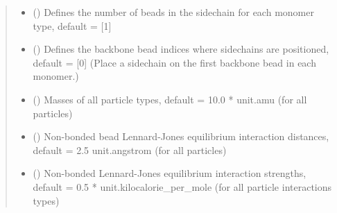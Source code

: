 \documentclass[letterpaper,12pt,english,openany,oneside]{sphinxmanual}
\begin{document}
\begin{fulllineitems}
\begin{quote}
\begin{description}
\begin{itemize}
\item {} 
 (\sphinxstyleliteralemphasis{\sphinxupquote{( }}\sphinxstyleliteralemphasis{\sphinxupquote{ )}}) \textendash{} Defines the number of beads in the sidechain for each monomer type, default = {[}1{]}

\item {} 
 (\sphinxstyleliteralemphasis{\sphinxupquote{( }}\sphinxstyleliteralemphasis{\sphinxupquote{ )}}) \textendash{} Defines the backbone bead indices where sidechains are positioned, default = {[}0{]} (Place a sidechain on the first backbone bead in each monomer.)

\item {} 
 (\sphinxstyleliteralemphasis{\sphinxupquote{( }}\sphinxstyleliteralemphasis{\sphinxupquote{, }}\sphinxstyleliteralemphasis{\sphinxupquote{ )}}) \textendash{} Masses of all particle types, default = 10.0 * unit.amu (for all particles)

\item {} 
 (\sphinxstyleliteralemphasis{\sphinxupquote{( }}\sphinxstyleliteralemphasis{\sphinxupquote{,}}\sphinxstyleliteralemphasis{\sphinxupquote{,}}) \textendash{} Non-bonded bead Lennard-Jones equilibrium interaction distances, default = 2.5 unit.angstrom (for all particles)

\item {} 
 (\sphinxstyleliteralemphasis{\sphinxupquote{( }}\sphinxstyleliteralemphasis{\sphinxupquote{,}}\sphinxstyleliteralemphasis{\sphinxupquote{,}}\sphinxstyleliteralemphasis{\sphinxupquote{ )}}) \textendash{} Non-bonded Lennard-Jones equilibrium interaction strengths, default = 0.5 * unit.kilocalorie\_per\_mole (for all particle interactions types)


\end{itemize}
\end{description}
\end{quote}
\end{fulllineitems}
\end{document}
